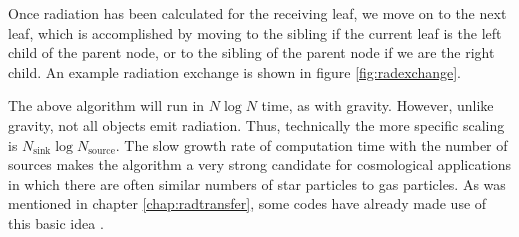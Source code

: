 Once radiation has been calculated for the receiving leaf, we move on to the next leaf, which is accomplished by moving to the sibling if the current leaf is the left child of the parent node, or to the sibling of the parent node if we are the right child. An example radiation exchange is shown in figure \ref{fig:radexchange}.

The above algorithm will run in $N\log{N}$ time, as with gravity. However, unlike gravity, not all objects emit radiation. Thus, technically the more specific scaling is $N_{\mbox{sink}}\log{N_{\mbox{source}}}$. The slow growth rate of computation time with the number of sources makes the algorithm a very strong candidate for cosmological applications in which there are often similar numbers of star particles to gas particles. As was mentioned in chapter \ref{chap:radtransfer}, some codes have already made use of this basic idea \citep{gnedinAbel01,hopkins, kannanEt14}.




